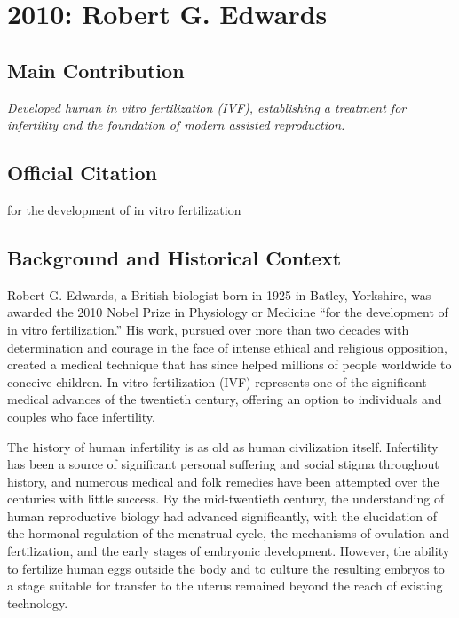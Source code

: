 \chapter[2010 --- Edwards]{2010: Robert G. Edwards}
\label{ch:2010_robertgedwards}

\section*{Main Contribution}

\textit{Developed human in vitro fertilization (IVF), establishing a treatment for infertility and the foundation of modern assisted reproduction.}\cite{nobel-2010,lecture-2010}

\section{Official Citation}

for the development of in vitro fertilization

\section{Background and Historical Context}

Robert G. Edwards, a British biologist born in 1925 in Batley, Yorkshire, was awarded the 2010 Nobel Prize in Physiology or Medicine ``for the development of in vitro fertilization.'' His work, pursued over more than two decades with determination and courage in the face of intense ethical and religious opposition, created a medical technique that has since helped millions of people worldwide to conceive children. In vitro fertilization (IVF) represents one of the significant medical advances of the twentieth century, offering an option to individuals and couples who face infertility.

The history of human infertility is as old as human civilization itself. Infertility has been a source of significant personal suffering and social stigma throughout history, and numerous medical and folk remedies have been attempted over the centuries with little success. By the mid-twentieth century, the understanding of human reproductive biology had advanced significantly, with the elucidation of the hormonal regulation of the menstrual cycle, the mechanisms of ovulation and fertilization, and the early stages of embryonic development. However, the ability to fertilize human eggs outside the body and to culture the resulting embryos to a stage suitable for transfer to the uterus remained beyond the reach of existing technology.

